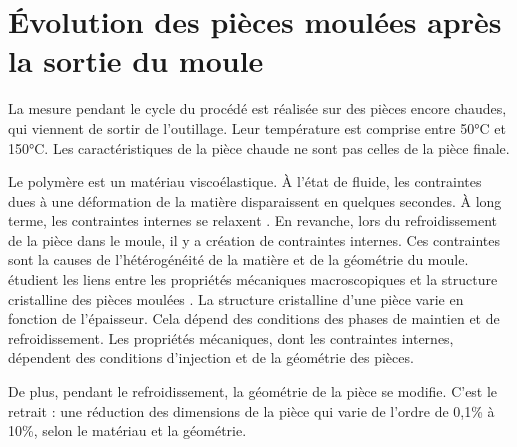 \newpage
\section{Évolution des pièces moulées après la sortie du moule}
La mesure pendant le cycle du procédé est réalisée sur des pièces encore chaudes, qui viennent de sortir de l'outillage.
Leur température est comprise entre 50°C et 150°C.
Les caractéristiques de la pièce chaude ne sont pas celles de la pièce finale.

Le polymère est un matériau viscoélastique.
À l'état de fluide, les contraintes dues à une déformation de la matière disparaissent en quelques secondes.
À long terme, les contraintes internes se relaxent \cite{giroud_mesure_2001}.
En revanche, lors du refroidissement de la pièce dans le moule, il y a création de contraintes internes.
Ces contraintes sont la causes de l'hétérogénéité de la matière et de la géométrie du moule.
\citeauthor{galeski_nano_2009} étudient les liens entre les propriétés mécaniques macroscopiques et la structure cristalline des pièces moulées \cite{galeski_nano_2009}.
La structure cristalline d'une pièce varie en fonction de l'épaisseur.
Cela dépend des conditions des phases de maintien et de refroidissement.
Les propriétés mécaniques, dont les contraintes internes, dépendent des conditions d'injection et de la géométrie des pièces.

De plus, pendant le refroidissement, la géométrie de la pièce se modifie. C'est le retrait : une réduction des dimensions de la pièce qui varie de l'ordre de 0,1\% à 10\%, selon le matériau et la géométrie.


